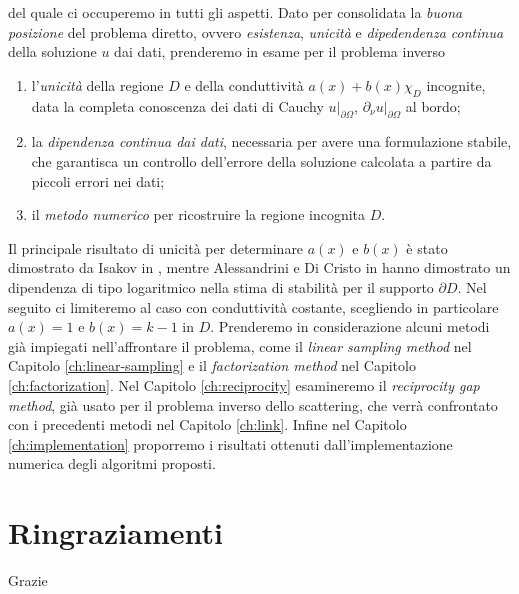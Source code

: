 \documentclass[10pt, a4paper, twoside, openright]{book}
\theoremstyle{definition}
\theoremstyle{plain}
\theoremstyle{plain}
\theoremstyle{plain}
\theoremstyle{plain}
\theoremstyle{plain}
\theoremstyle{plain}
\theoremstyle{plain}
\theoremstyle{plain}
\begin{document}
del quale ci occuperemo in tutti gli aspetti. Dato per consolidata la 
\emph{buona posizione} del problema diretto, ovvero \emph{esistenza}, \emph{unicità} e \emph{dipedendenza 
continua} della soluzione $u$ dai dati, prenderemo in esame per il problema inverso
\begin{enumerate}
 \item l'\emph{unicità} della regione $D$ e della conduttività $a(x) + b(x)\chi_D$ incognite, data 
 la completa conoscenza dei dati di Cauchy $u|_{\partial \Omega}$, 
 $\partial_\nu u|_{\partial \Omega}$ al bordo;
 \item la \emph{dipendenza continua dai dati}, necessaria per avere una formulazione stabile, 
 che garantisca un controllo dell'errore della soluzione calcolata a partire da piccoli errori 
 nei dati;
 \item il \emph{metodo numerico} per ricostruire la regione incognita $D$.
\end{enumerate}
Il principale risultato di unicità per determinare $a(x)$ e $b(x)$ è stato dimostrato da Isakov in \cite{Is88}, 
mentre Alessandrini e Di Cristo in \cite{Al-DC} hanno dimostrato un dipendenza di tipo logaritmico nella 
stima di stabilità per il supporto $\partial D$.
Nel seguito ci limiteremo al caso con conduttività costante, scegliendo in particolare $a(x)=1$ e $b(x)=k-1$ in $D$.
Prenderemo in considerazione alcuni metodi già impiegati nell'affrontare il problema, 
come il \emph{linear sampling method} nel Capitolo \ref{ch:linear-sampling} e il 
\emph{factorization method} nel Capitolo \ref{ch:factorization}. Nel Capitolo \ref{ch:reciprocity} 
esamineremo il \emph{reciprocity gap method}, già usato per il problema inverso dello 
scattering, che verrà confrontato con i precedenti metodi nel Capitolo \ref{ch:link}.
Infine nel Capitolo \ref{ch:implementation} proporremo i risultati ottenuti 
dall'implementazione numerica degli algoritmi proposti.

\chapter*{Ringraziamenti}
Grazie


\tableofcontents
\mainmatter
\end{document}
